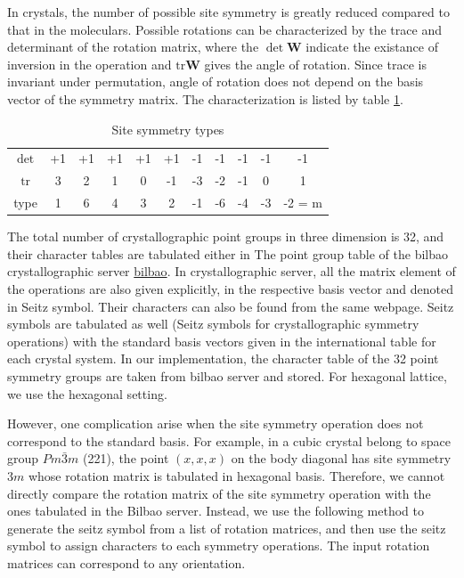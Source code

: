 \documentclass{article}
\begin{document}
In crystals, the number of possible site symmetry is greatly reduced compared to 
that in the moleculars. Possible rotations can be characterized by the trace 
and determinant of the rotation matrix, where the $\det\mathbf{W}$ indicate the 
existance of inversion in the operation and $\text{tr}\mathbf{W}$ gives the angle of rotation. 
Since trace is invariant under permutation, angle of rotation does not depend on the 
basis vector of the symmetry matrix. The characterization is listed by table \ref{T:operation_properties}.
\begin{table}[h]
    \centering
    \caption{Site symmetry types}
    \begin{tabular}{|c|cccccccccc|}
        \hline
        $\det$      & +1 & +1 & +1 & +1 & +1 & -1 & -1 & -1 & -1 & -1 \\ 
        $\text{tr}$ &  3 &  2 &  1 &  0 & -1 & -3 & -2 & -1 &  0 &  1 \\  
        \hline
        type        &  1 &  6 &  4 &  3 &  2 & -1 & -6 & -4 & -3 & -2 = m \\ 
        \hline
    \end{tabular}
    \label{T:operation_properties}
\end{table}

The total number of crystallographic point groups in three dimension is 32, and their character tables are 
tabulated either in The point group table of the bilbao crystallographic server \href{https://www.cryst.ehu.es/rep/point.html}{bilbao}. 
In crystallographic server, all the matrix element of the operations are also given explicitly, in the respective basis vector 
and denoted in Seitz symbol. Their characters can also be found from the same webpage.
Seitz symbols are tabulated as well (Seitz symbols for crystallographic symmetry operations)
with the standard basis vectors given in the international table for each crystal system. 
In our implementation, the character table of the 32 point symmetry groups are taken from bilbao server and 
stored. For hexagonal lattice, we use the hexagonal setting.

However, one complication arise when the site symmetry operation does not correspond to the standard basis. For example, 
in a cubic crystal belong to space group $Pm\bar{3}m$ (221), the point $(x,x,x)$ on the body diagonal has site symmetry $3m$
whose rotation matrix is tabulated in hexagonal basis. Therefore, we cannot directly compare the rotation matrix of the 
site symmetry operation with the ones tabulated in the Bilbao server. Instead, we use the following method to generate 
the seitz symbol from a list of rotation matrices, and then use the seitz symbol to assign characters to each symmetry 
operations. The input rotation matrices can correspond to any orientation.
\end{document}
